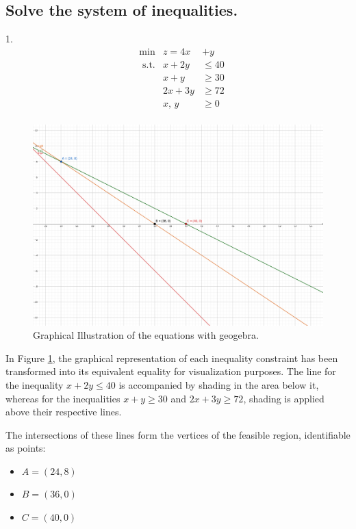 \documentclass[unicode,11pt,a4paper,oneside,numbers=endperiod,openany]{scrartcl}
\begin{document}
\subsection{Solve the system of inequalities.}
1. \newline
\begin{equation*}
		\begin{aligned}
		& \text{min}  &  z=4x&+y\\
		& \text{ s.t.} &  x+2y &\leq 40 \\
		& &   x+y &\geq 30\\
		& &   2x+3y &\geq 72 \\
		& &  x,\,y &\geq0 \\
		\end{aligned}
\end{equation*}


\begin{figure}[H]
    \centering
    \includegraphics[trim=0cm 10cm 10cm 2cm, clip, width=\textwidth]{geogebra-export.png}
    \caption{Graphical Illustration of the equations with geogebra.}
    \label{fig:img1}
\end{figure}

In Figure \ref{fig:img1}, the graphical representation of each inequality constraint has been transformed into its equivalent equality for visualization purposes. The line for the inequality $x + 2y \leq 40$ is accompanied by shading in the area below it, whereas for the inequalities $x + y \geq 30$ and $2x + 3y \geq 72$, shading is applied above their respective lines.

The intersections of these lines form the vertices of the feasible region, identifiable as points:
\begin{itemize}
 \item $A = (24, 8)$
 \item $B = (36, 0)$
 \item $C = (40, 0)$
\end{itemize}
\end{document}

